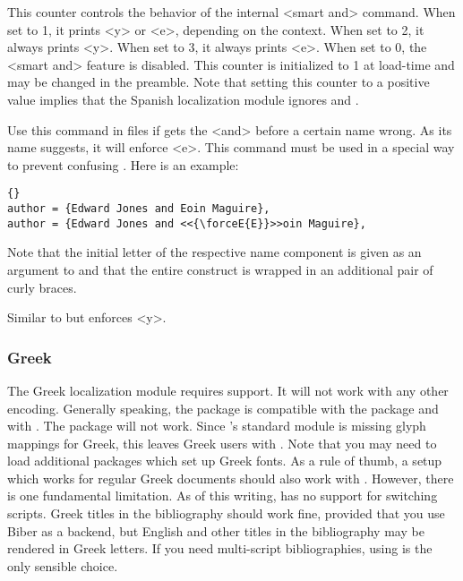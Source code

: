 \documentclass{ltxdockit}[2011/03/25]
\newcommand*{\biber}{Biber\xspace}
\begin{document}
\begin{ltxsyntax}


This counter controls the behavior of the internal <smart and> command. When set to 1, it prints <y> or <e>, depending on the context. When set to 2, it always prints <y>. When set to 3, it always prints <e>. When set to 0, the <smart and> feature is disabled. This counter is initialized to 1 at load-time and may be changed in the preamble. Note that setting this counter to a positive value implies that the Spanish localization module ignores  and .


Use this command in  files if  gets the <and> before a certain name wrong. As its name suggests, it will enforce <e>. This command must be used in a special way to prevent confusing \bibtex. Here is an example:

\begin{lstlisting}[style=bibtex]{}
author = {Edward Jones and Eoin Maguire},
author = {Edward Jones and <<{\forceE{E}}>>oin Maguire},
\end{lstlisting}
%
Note that the initial letter of the respective name component is given as an argument to  and that the entire construct is wrapped in an additional pair of curly braces.


Similar to  but enforces <y>.

\end{ltxsyntax}

\subsubsection{Greek}
\label{use:loc:grk}

The Greek localization module requires \utf support. It will not work with any other encoding. Generally speaking, the  package is compatible with the  package and with \xelatex. The  package will not work. Since 's standard  module is missing glyph mappings for Greek, this leaves Greek users with \xelatex. Note that you may need to load additional packages which set up Greek fonts. As a rule of thumb, a setup which works for regular Greek documents should also work with . However, there is one fundamental limitation. As of this writing,  has no support for switching scripts. Greek titles in the bibliography should work fine, provided that you use \biber as a backend, but English and other titles in the bibliography may be rendered in Greek letters. If you need multi-script bibliographies, using \xelatex is the only sensible choice.
\end{document}
